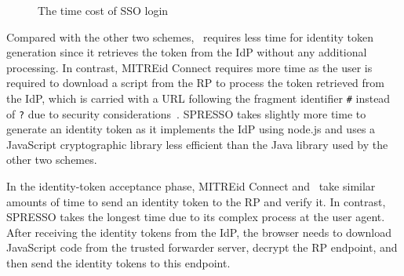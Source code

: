 \begin{figure}[tb]
  \centering
  \caption{The time cost of SSO login}
  \label{fig:evaluation}
\end{figure}

Compared with the other two schemes, \usso~requires less time for identity token generation since it retrieves the token from the IdP without any additional processing. In contrast,
MITREid Connect requires more time as the user is required to download a script from the RP to process the token retrieved from the IdP, which is carried with a URL following the fragment identifier \verb+#+ instead of \verb+?+ due to security considerations~\cite{de2014oauth}. SPRESSO takes slightly more time to generate an identity token as it implements the IdP using node.js and uses a JavaScript cryptographic library less efficient than the Java library used by the other two schemes.

In the identity-token acceptance phase, MITREid Connect and \usso~take similar amounts of time to send an identity token to the RP and verify it.
In contrast, SPRESSO takes the longest time due to its complex process at the user agent. After receiving the identity tokens from the IdP, the browser needs to download JavaScript code from the trusted forwarder server, decrypt the RP endpoint, and then send the identity tokens to this endpoint.

